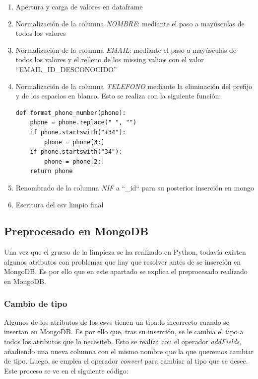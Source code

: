 \documentclass[]{article}
\begin{document}
\begin{enumerate}
    \item Apertura y carga de valores en dataframe
    \item Normalización de la columna \textit{NOMBRE}: mediante el paso a mayúsculas de todos los valores
    \item Normalización de la columna \textit{EMAIL}: mediante el paso a mayúsculas de todos los valores y el relleno de los missing values con el valor ``EMAIL\_ID\_DESCONOCIDO''
    \item Normalización de la columna \textit{TELEFONO} mediante la eliminación del prefijo y de los espacios en blanco. Esto se realiza con la siguiente función:

\begin{lstlisting}
def format_phone_number(phone):
    phone = phone.replace(" ", "")
    if phone.startswith("+34"):
        phone = phone[3:]
    if phone.startswith("34"):
        phone = phone[2:]
    return phone
\end{lstlisting}

    \item Renombrado de la columna \textit{NIF} a ``\_id`` para su posterior inserción en mongo
    \item Escritura del csv limpio final
\end{enumerate}

\newpage
\subsection{Preprocesado en MongoDB}
\label{subsec:preprocessmongo}
Una vez que el grueso de la limpieza se ha realizado en Python, todavía existen algunos atributos con problemas que hay que resolver antes de se inserción en MongoDB. Es por ello que en este apartado se explica el preprocesado realizado en MongoDB.

\subsubsection{Cambio de tipo}
\label{subsubsec:preprocessmongocambiodetipo}

Algunos de los atributos de los csvs tienen un tipado incorrecto cuando se insertan en MongoDB. Es por ello que, tras su inserción, se le cambia el tipo a todos los atributos que lo necesiteb. Esto se realiza con el operador \textit{addFields}, añadiendo una nueva columna con el mismo nombre que la que queremos cambiar de tipo. Luego, se emplea el operador \textit{convert} para cambiar al tipo que se desee. Este proceso se ve en el siguiente código:
\end{document}
